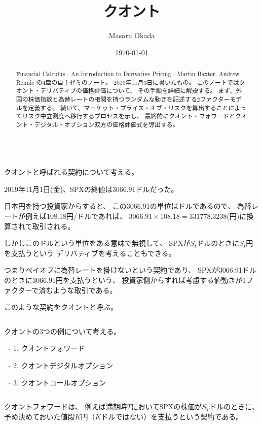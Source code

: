\documentclass[uplatex,a4j,12pt,dvipdfmx]{jsarticle}
\title{
クオント
}
\author{Masaru Okada}
\date{\today}
\begin{document}
\maketitle

\begin{abstract}
	Financial Calculus - An Introduction to Derivative Pricing - Martin Baxter, Andrew Rennie の4章の自主ゼミのノート。
	2019年11月3日に書いたもの。
    このノートではクオント・デリバティブの価格評価について、
    その手順を詳細に解説する。
    まず、外国の株価指数と為替レートの相関を持つランダムな動きを記述する2ファクターモデルを定義する。
    続いて、マーケット・プライス・オブ・リスクを算出することによってリスク中立測度へ移行するプロセスを示し、
    最終的にクオント・フォワードとクオント・デジタル・オプション双方の価格評価式を導出する。
\end{abstract}

\tableofcontents

\ \\

クオントと呼ばれる契約について考える。

2019年11月1日(金)、SPXの終値は3066.91ドルだった。

日本円を持つ投資家からすると、
この3066.91の単位はドルであるので、
為替レートが例えば108.18円/ドルであれば、
$3066.91 \times 108.18 = 331778.3238$(円)に換算されて取引される。

しかしこのドルという単位をある意味で無視して、
SPXが$S_{t}$ドルのときに$S_{t}$円を支払うという
デリバティブを考えることもできる。

つまりペイオフに為替レートを掛けないという契約であり、
SPXが3066.91ドルのときに3066.91円を支払うという、
投資家側からすれば考慮する値動きが1ファクターで済むような取引である。

このような契約をクオントと呼ぶ。

${}$

クオントの3つの例について考える。

$\hspace{2mm} \cdot$
1. クオントフォワード

$\hspace{2mm} \cdot$
2. クオントデジタルオプション

$\hspace{2mm} \cdot$
3. クオントコールオプション

${}$

クオントフォワードは、
例えば満期時$T$においてSPXの株価が$S_{T}$ドルのときに、
予め決めておいた値段$K$円（$K$ドルではない）を支払うという契約である。
\end{document}
